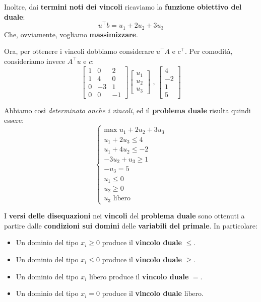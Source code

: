 Inoltre, dai \textbf{termini noti dei vincoli} ricaviamo
la \textbf{funzione obiettivo del duale}:
\[
    u^\top b = u_{1} + 2u_{2} + 3u_{3}
\]
Che, ovviamente, vogliamo \textbf{massimizzare}.

Ora, per ottenere i vincoli dobbiamo considerare $u^\top A$ e $c^\top$. 
Per comodità, consideriamo invece $A^\top u$ e $c$:
\[
    \begin{bmatrix} 
        1 & 0 & 2 \\ 
        1 & 4 & 0 \\ 
        0 &-3 & 1 \\ 
        0 & 0 & -1
    \end{bmatrix} \begin{bmatrix} u_{1} \\ u_{2} \\ u_{3} \end{bmatrix} \text{ , } 
    \begin{bmatrix} 4 \\ -2 \\ 1 \\ 5 \end{bmatrix} 
\]

Abbiamo così \textit{determinato anche i vincoli}, ed il \textbf{problema duale} 
risulta quindi essere:
\[
    \begin{cases}
        \text{max } u_{1} + 2u_{2} +3u_{3} \\ 
        u_{1} + 2u_{3} \le 4 \\ 
        u_{1} + 4u_{2} \le -2 \\ 
        -3u_{2} + u_{3} \ge 1 \\ 
        -u_{3} = 5 \\ 
        u_{1} \le 0 \\ 
        u_{2} \ge 0 \\
        u_{3} \text{ libero}
    \end{cases}
\]

\begin{remark}
    I \textbf{versi delle disequazioni} nei \textbf{vincoli} del \textbf{problema duale}
    sono ottenuti a partire dalle \textbf{condizioni sui domini} delle
    \textbf{variabili del primale}. In particolare:
    \begin{itemize}
        \item Un dominio del tipo $x_i\ge 0$ produce il 
            \textbf{vincolo duale} $\le $.
        \item Un dominio del tipo $x_i \le 0$ produce il
            \textbf{vincolo duale} $\ge $.
        \item Un dominio del tipo $x_i \text{ libero}$ produce il 
            \textbf{vincolo duale} $=$.
        \item Un dominio del tipo $x_i = 0$ produce il
            \textbf{vincolo duale} $\text{libero}$.
    \end{itemize}
\end{remark}
